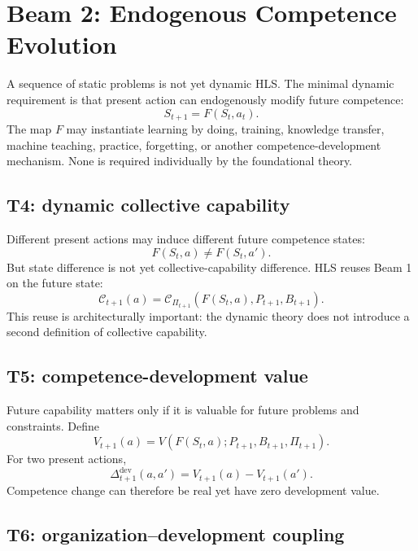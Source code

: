 \documentclass[10pt]{article}
\newcommand{\Ccap}{\mathcal{C}}
\begin{document}
\section{Beam 2: Endogenous Competence Evolution}

A sequence of static problems is not yet dynamic HLS. The minimal dynamic requirement is that present action can endogenously modify future competence:
\begin{equation}
\boxed{S_{t+1}=F(S_t,a_t).}
\label{eq:transition}
\end{equation}
The map $F$ may instantiate learning by doing, training, knowledge transfer, machine teaching, practice, forgetting, or another competence-development mechanism. None is required individually by the foundational theory.

\subsection{T4: dynamic collective capability}

Different present actions may induce different future competence states:
\begin{equation}
F(S_t,a)\neq F(S_t,a').
\end{equation}
But state difference is not yet collective-capability difference. HLS reuses Beam 1 on the future state:
\begin{equation}
\Ccap_{t+1}(a)
=
\Ccap_{\Pi_{t+1}}
\left(F(S_t,a),P_{t+1},B_{t+1}\right).
\label{eq:futurecap}
\end{equation}
This reuse is architecturally important: the dynamic theory does not introduce a second definition of collective capability.

\subsection{T5: competence-development value}

Future capability matters only if it is valuable for future problems and constraints. Define
\begin{equation}
V_{t+1}(a)=
V\!\left(F(S_t,a);P_{t+1},B_{t+1},\Pi_{t+1}\right).
\end{equation}
For two present actions,
\begin{equation}
\Delta^{\mathrm{dev}}_{t+1}(a,a')
=V_{t+1}(a)-V_{t+1}(a').
\end{equation}
Competence change can therefore be real yet have zero development value.

\subsection{T6: organization--development coupling}
\end{document}
